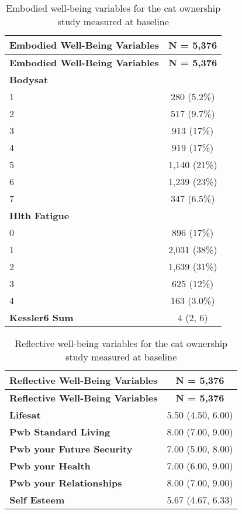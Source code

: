 \documentclass[
  singlecolumn,
  9pt]{article}
\begin{document}
\begin{longtable}[]{@{}lc@{}}
\caption{Embodied well-being variables for the cat ownership study
measured at baseline}\label{tbl-table_embody_vars_cats-m}\tabularnewline
\toprule\noalign{}
\textbf{Embodied Well-Being Variables} & \textbf{N = 5,376} \\
\midrule\noalign{}
\endfirsthead
\toprule\noalign{}
\textbf{Embodied Well-Being Variables} & \textbf{N = 5,376} \\
\midrule\noalign{}
\endhead
\bottomrule\noalign{}
\endlastfoot
\textbf{Bodysat} & \\
1 & 280 (5.2\%) \\
2 & 517 (9.7\%) \\
3 & 913 (17\%) \\
4 & 919 (17\%) \\
5 & 1,140 (21\%) \\
6 & 1,239 (23\%) \\
7 & 347 (6.5\%) \\
\textbf{Hlth Fatigue} & \\
0 & 896 (17\%) \\
1 & 2,031 (38\%) \\
2 & 1,639 (31\%) \\
3 & 625 (12\%) \\
4 & 163 (3.0\%) \\
\textbf{Kessler6 Sum} & 4 (2, 6) \\
\end{longtable}

\begin{longtable}[]{@{}lc@{}}
\caption{Reflective well-being variables for the cat ownership study
measured at
baseline}\label{tbl-table_reflective_vars_cats-m}\tabularnewline
\toprule\noalign{}
\textbf{Reflective Well-Being Variables} & \textbf{N = 5,376} \\
\midrule\noalign{}
\endfirsthead
\toprule\noalign{}
\textbf{Reflective Well-Being Variables} & \textbf{N = 5,376} \\
\midrule\noalign{}
\endhead
\bottomrule\noalign{}
\endlastfoot
\textbf{Lifesat} & 5.50 (4.50, 6.00) \\
\textbf{Pwb Standard Living} & 8.00 (7.00, 9.00) \\
\textbf{Pwb your Future Security} & 7.00 (5.00, 8.00) \\
\textbf{Pwb your Health} & 7.00 (6.00, 9.00) \\
\textbf{Pwb your Relationships} & 8.00 (7.00, 9.00) \\
\textbf{Self Esteem} & 5.67 (4.67, 6.33) \\
\end{longtable}
\end{document}
